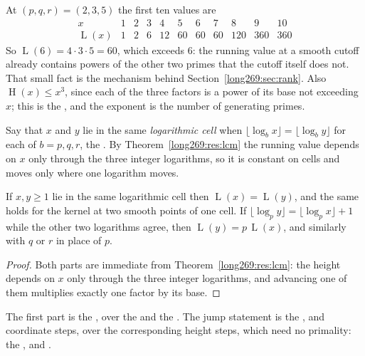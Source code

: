 \documentclass[11pt]{article}
\newcommand{\hgt}{\operatorname{H}}
\newcommand{\Lprefix}{\operatorname{L}}
\begin{document}
At $(p,q,r)=(2,3,5)$ the first ten values are
\[
\begin{array}{c|cccccccccc}
x&1&2&3&4&5&6&7&8&9&10\\ \hline
\Lprefix(x)&1&2&6&12&60&60&60&120&360&360
\end{array}
\]
So $\Lprefix(6)=4\cdot3\cdot5=60$, which exceeds $6$: the running value at a
smooth cutoff already contains powers of the other two primes that the cutoff
itself does not.  That small fact is the mechanism behind
Section~\ref{long269:sec:rank}.  Also $\hgt(x)\le x^{3}$, since each of the three
factors is a power of its base not exceeding $x$; this is the
, and the exponent is the number of generating primes.

Say that $x$ and $y$ lie in the same \emph{logarithmic cell} when
$\lfloor\log_b x\rfloor=\lfloor\log_b y\rfloor$ for each of $b=p,q,r$, the
.  By Theorem~\ref{long269:res:lcm} the running value depends on $x$ only
through the three integer logarithms, so it is constant on cells and moves only
where one logarithm moves.

\begin{proposition}\label{long269:res:cell}
If $x,y\ge1$ lie in the same logarithmic cell then $\Lprefix(x)=\Lprefix(y)$,
and the same holds for the kernel at two smooth points of one cell.  If
$\lfloor\log_p y\rfloor=\lfloor\log_p x\rfloor+1$ while the other two
logarithms agree, then $\Lprefix(y)=p\,\Lprefix(x)$, and similarly with $q$ or
$r$ in place of $p$.
\end{proposition}

\begin{proof}
Both parts are immediate from Theorem~\ref{long269:res:lcm}: the height depends on $x$
only through the three integer logarithms, and advancing one of them multiplies
exactly one factor by its base.
\end{proof}

\noindent The first part is the
, over the
 and the
.  The jump statement is
\label{long269:res:jump}the
,
and
coordinate steps, over the corresponding height steps, which need no primality:
the
,
and
.
\end{document}
